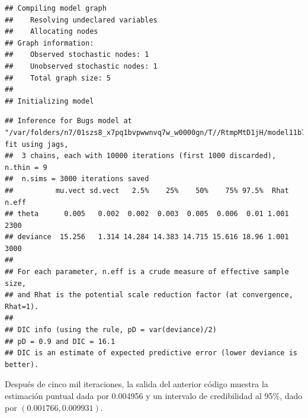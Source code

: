 \begin{Eje}
\begin{knitrout}
\begin{kframe}
\begin{alltt}
 \hlkwb{<-} \hlstd{(}\hlstd{)}
 \hlkwb{<-} \hlstd{()\{}
\hlstd{(}\hlstd{=}\hlstd{)}
\hlstd{\}}

 \hlkwb{<-} \hlstd{(}\hlstd{=}\hlstd{(}\hlstd{=}\hlstd{),}\hlstd{=}\hlstd{,}\hlstd{=}\hlstd{,}
\end{alltt}
\begin{verbatim}
## Compiling model graph
##    Resolving undeclared variables
##    Allocating nodes
## Graph information:
##    Observed stochastic nodes: 1
##    Unobserved stochastic nodes: 1
##    Total graph size: 5
## 
## Initializing model
\end{verbatim}
\begin{alltt}
\end{alltt}
\begin{verbatim}
## Inference for Bugs model at "/var/folders/n7/01szs8_x7pq1bvpwwnvq7w_w0000gn/T//RtmpMtD1jH/model11b725be15f2.txt", fit using jags,
##  3 chains, each with 10000 iterations (first 1000 discarded), n.thin = 9
##  n.sims = 3000 iterations saved
##          mu.vect sd.vect   2.5%    25%    50%    75% 97.5%  Rhat n.eff
## theta      0.005   0.002  0.002  0.003  0.005  0.006  0.01 1.001  2300
## deviance  15.256   1.314 14.284 14.383 14.715 15.616 18.96 1.001  3000
## 
## For each parameter, n.eff is a crude measure of effective sample size,
## and Rhat is the potential scale reduction factor (at convergence, Rhat=1).
## 
## DIC info (using the rule, pD = var(deviance)/2)
## pD = 0.9 and DIC = 16.1
## DIC is an estimate of expected predictive error (lower deviance is better).
\end{verbatim}
\end{kframe}
\end{knitrout}
    
    Despu\'es de cinco mil iteraciones, la salida del anterior c\'odigo muestra la estimaci\'on puntual dada por 0.004956 y un intervalo de credibilidad al 95\%, dado por $(0.001766, 0.009931)$.
    \end{Eje}
    

